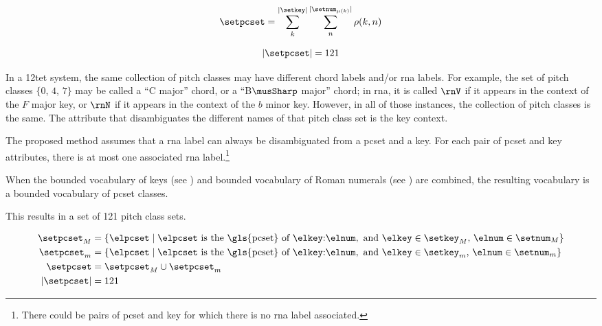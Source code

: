 
\begin{equation}
    \setpcset = \sum_{k}^{| \setkey |} \sum_{n}^{| \setnum_{\mu(k)} |} \rho(k, n)
\end{equation}

\begin{equation}
    | \setpcset | = 121
\end{equation}

In a \gls{12tet} system, the same collection of pitch
classes may have different chord labels and/or \gls{rna}
labels. For example, the set of pitch classes $\{0$, $4$,
$7\}$ may be called a ``C major'' chord, or a ``B$\musSharp$
major'' chord; in \gls{rna}, it is called $\rnV$ if it
appears in the context of the $F$ major key, or $\rnN$ if it
appears in the context of the $b$ minor key. However, in all
of those instances, the collection of pitch classes is the
same. The attribute that disambiguates the different names
of that pitch class set is the key context.

The proposed method assumes that a \gls{rna} label can
always be disambiguated from a \gls{pcset} and a key. For
each pair of \gls{pcset} and key attributes, there is at
most one associated \gls{rna} label.\footnote{There could be
pairs of \gls{pcset} and key for which there is no \gls{rna}
label associated.}

When the bounded vocabulary of keys (see
) and bounded vocabulary
of Roman numerals (see
) are combined, the
resulting vocabulary is a bounded vocabulary of \gls{pcset}
classes.

This results in a set of 121 pitch class sets.

\begin{equation}
    \begin{split}
    \setpcset_M &= \{ \elpcset \mid \elpcset \text{ is the \gls{pcset} of }
    \elkey\text{:}\elnum, \text{ and }
    \elkey \in \setkey_M \text{, } \elnum \in \setnum_M  \} \\
    \setpcset_m &= \{ \elpcset \mid \elpcset \text{ is the \gls{pcset} of }
    \elkey\text{:}\elnum, \text{ and }
    \elkey \in \setkey_m \text{, } \elnum \in \setnum_m  \} \\
    \setpcset &= \setpcset_M \cup \setpcset_m \\
    | \setpcset | &= 121 \\    
    \end{split}
\end{equation}

